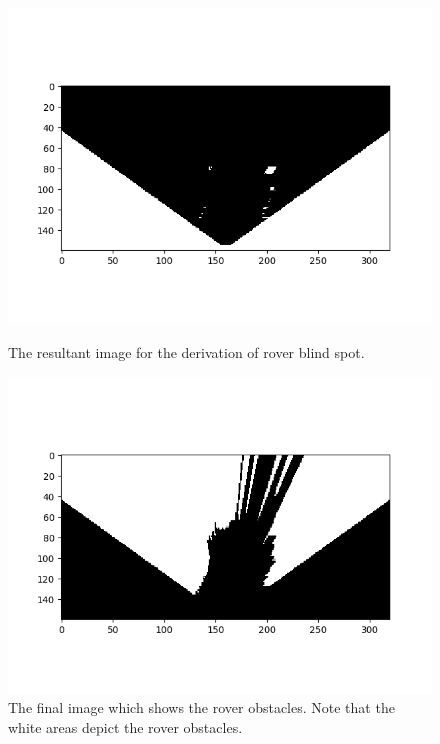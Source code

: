 \documentclass[a4paper]{article}
\begin{document}
\begin{figure}[h]
	\centering
	\begin{minipage}[t]{0.45\linewidth}
	\centering
	\includegraphics[scale=0.45]{image12}
	\vspace{-1.5cm}
	\caption{The resultant image for the derivation of rover blind spot.}
	\end{minipage}
	\hspace{0.5cm}
	\begin{minipage}[t]{0.45\linewidth}
	\centering
	\includegraphics[scale=0.45]{image13}
	\vspace{-1.5cm}
	\caption{The final image which shows the rover obstacles. Note that the white areas depict the rover obstacles.}
	\end{minipage}
\end{figure}
\end{document}
